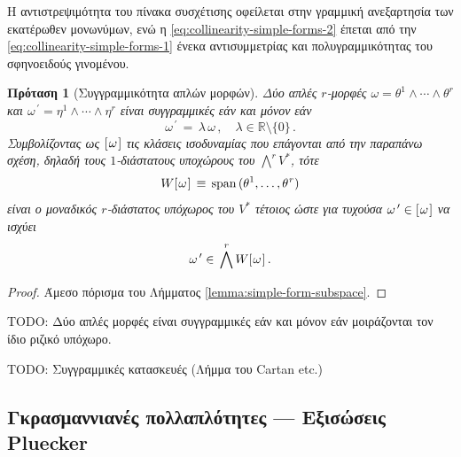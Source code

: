 \documentclass[11pt,a4paper,twoside,openright]{book}
\newtheorem{proposition}[lemma]{Πρόταση}
\begin{document}
\noindent
Η αντιστρεψιμότητα του πίνακα συσχέτισης οφείλεται στην γραμμική ανεξαρτησία των εκατέρωθεν μονωνύμων,
ενώ η \eqref{eq:collinearity-simple-forms-2} έπεται από την \eqref{eq:collinearity-simple-forms-1}
ένεκα αντισυμμετρίας και πολυγραμμικότητας του σφηνοειδούς γινομένου.
\begin{proposition}[Συγγραμμικότητα απλών μορφών]
	\label{prop:linearity-simple-forms}
Δύο απλές $r$-μορφές
$\omega = \theta^1 \wedge \cdots \wedge \theta^r$ και
$\omega^{\,\prime} = \eta^1 \wedge \cdots \wedge \eta^r$
είναι συγγραμμικές εάν και μόνον εάν
\begin{equation}\label{eq:collinearity-simple-forms-3}
\omega^{\,\prime} \,=\, \lambda \, \omega\,,
\quad
\lambda \in \mathbb{R} \setminus \{0\}\,.
\end{equation}
Συμβολίζοντας ως $[\hspace{.75pt}\omega\hspace{.75pt}]$
τις κλάσεις ισοδυναμίας που επάγονται από την παραπάνω σχέση,
δηλαδή τους $1$-διάστατους υποχώρους του $\bigwedge^r V^*$,
τότε
\begin{equation}
W[\hspace{.75pt}\omega\hspace{.75pt}]
\,\equiv\,
\operatorname{span}\,(\theta^1, \dots, \theta^{\hspace{.5pt}r})
\end{equation}
είναι ο μοναδικός $r$-διάστατος υπόχωρος του $V^*$ τέτοιος ώστε
για τυχούσα $\omega^{\,\prime} \in [\hspace{.75pt}\omega\hspace{.75pt}]$ να ισχύει
\begin{equation}
\omega^{\,\prime} \in\, \bigwedge^r W[\hspace{.75pt}\omega\hspace{.75pt}]\,.
\end{equation}
\end{proposition}
\begin{proof}
Άμεσο πόρισμα του Λήμματος \ref{lemma:simple-form-subspace}.
\end{proof}

TODO: Δύο απλές μορφές είναι συγγραμμικές εάν και μόνον εάν μοιράζονται τον ίδιο ριζικό υπόχωρο.

TODO: Συγγραμμικές κατασκευές (Λήμμα του Cartan etc.)

\subsection{Γκρασμαννιανές πολλαπλότητες --- Εξισώσεις Pluecker}
\end{document}
